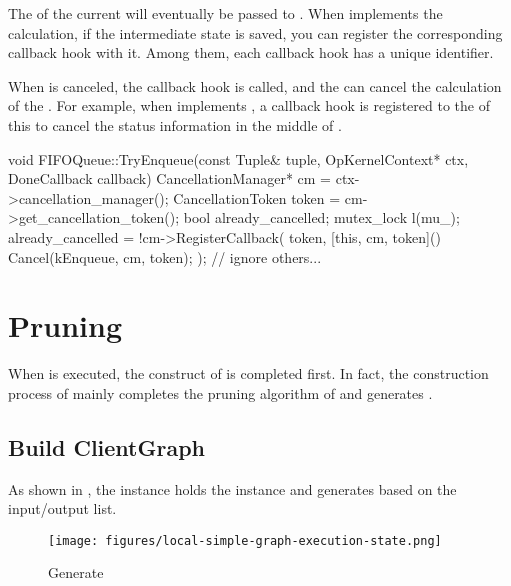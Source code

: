 The  of the current  will eventually be passed to . When  implements the calculation, if the intermediate state is saved, you can register the corresponding callback hook with it. Among them, each callback hook has a unique  identifier.

When  is canceled, the callback hook is called, and the  can cancel the calculation of the . For example, when  implements , a callback hook is registered to the  of this  to cancel the status information in the middle of .

\begin{leftbar}
\begin{c++}
void FIFOQueue::TryEnqueue(const Tuple& tuple, OpKernelContext* ctx,
                           DoneCallback callback) {
  CancellationManager* cm = ctx->cancellation_manager();
  CancellationToken token = cm->get_cancellation_token();
  bool already_cancelled;
  {
    mutex_lock l(mu_);
    already_cancelled = !cm->RegisterCallback(
        token, [this, cm, token]() { Cancel(kEnqueue, cm, token); });
  }
  // ignore others...
}
\end{c++}
\end{leftbar}


\section{Pruning}
\label{sec:graph-operation-prune}
When  is executed, the construct of  is completed first. In fact, the construction process of  mainly completes the pruning algorithm of  and generates .


\subsection{Build ClientGraph}
As shown in , the  instance holds the  instance and generates  based on the input/output list.

\begin{figure}[H]
  \centering
  \texttt{[image: figures/local-simple-graph-execution-state.png]}
  \caption{Generate}
  \label{fig:local-simple-graph-execution-state}
\end{figure}


